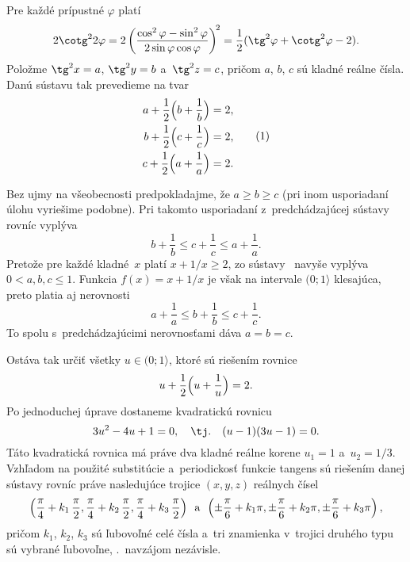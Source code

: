 {%
Pre každé prípustné $\varphi$ platí
$$
2\cotg^2 2\varphi=
   2\left(\frac{\cos^2 \varphi -\sin^2 \varphi}{2\sin\varphi \cos\varphi}
    \right)^{\!2}=\frac12(\tg^2 \varphi+\cotg^2 \varphi -2).
$$
Položme $\tg^2 x=a$, $\tg^2 y=b$ a~$\tg^2 z=c$, pričom $a$, $b$, $c$
sú kladné reálne čísla. Danú sústavu tak prevedieme na tvar
$$
\aligned
  a+\frac12\Bigl(b+\frac1b\Bigr) &= 2,\\
  b+\frac12\Bigl(c+\frac1c\Bigr) &= 2,\\
  c+\frac12\Bigl(a+\frac1a\Bigr) &= 2.
\endaligned \tag1
$$

Bez ujmy na všeobecnosti predpokladajme, že $a\geq b\geq c$ (pri inom usporiadaní úlohu vyriešime podobne).
Pri takomto usporiadaní z~predchádzajúcej sústavy rovníc vyplýva
$$
b+\frac1b\leq c+\frac1c\leq a+\frac1a.
$$
Pretože pre každé kladné~$x$ platí $x+1/x \geq 2$, zo
sústavy~ navyše vyplýva $0<a,b,c\leq 1$. Funkcia $f(x)=x+1/x$ je
však na intervale $(0;1\rangle$ klesajúca, preto platia aj nerovnosti
$$
a+\frac1a \leq b+\frac1b \leq c+\frac1c.
$$
To spolu s~predchádzajúcimi nerovnosťami dáva $a=b=c$.

Ostáva tak určiť všetky $u\in (0;1\rangle$, ktoré sú riešením rovnice
$$
u+\frac12\Bigl(u+\frac1u \Bigr)=2.
$$
Po jednoduchej úprave dostaneme kvadratickú rovnicu
$$
3u^2-4u+1=0,\quad \hbox{\tj.} \quad (u-1)(3u-1)=0.
$$
Táto kvadratická rovnica má práve dva kladné reálne korene
$u_1=1$ a~$u_2=1/3$. Vzhľadom na použité substitúcie
a~periodickosť funkcie tangens sú riešením danej sústavy rovníc
práve nasledujúce trojice $(x,y,z)$ reálnych čísel
$$
\left(\frac{\pi}4+k_1\,\frac{\pi}2,
         \frac{\pi}4+k_2\,\frac{\pi}2,
         \frac{\pi}4+k_3\,\frac{\pi}2\right)
\enspace \hbox{a} \enspace
    \left(\pm\frac{\pi}6+k_1\pi,
          \pm\frac{\pi}6+k_2\pi,
          \pm\frac{\pi}6+k_3\pi\right),
$$
pričom $k_1$, $k_2$, $k_3$ sú ľubovoľné celé čísla a~tri znamienka
v~trojici druhého typu sú vybrané ľubovoľne, \tj.~navzájom
nezávisle.}

